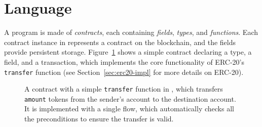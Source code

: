 \documentclass[nonacm, dvipsnames, usenames, sigconf]{acmart}
\begin{document}
\section{Language}\label{sec:lang}
A \langName program is made of \emph{contracts}, each containing \emph{fields}, \emph{types}, and \emph{functions}.
Each contract instance in \langName represents a contract on the blockchain, and the fields provide persistent storage.
Figure~\ref{fig:erc20-transfer-flow} shows a simple contract declaring a type, a field, and a transaction, which implements the core functionality of ERC-20's \lstinline{transfer} function (see Section~\ref{sec:erc20-impl} for more details on ERC-20).
\begin{figure}[ht]
    \centering
    
    \caption{A contract with a simple \lstinline{transfer} function in \langName, which transfers \lstinline{amount} tokens from the sender's account to the destination account.
It is implemented with a single flow, which automatically checks all the preconditions to ensure the transfer is valid.}
    \label{fig:erc20-transfer-flow}
\end{figure}
\end{document}

